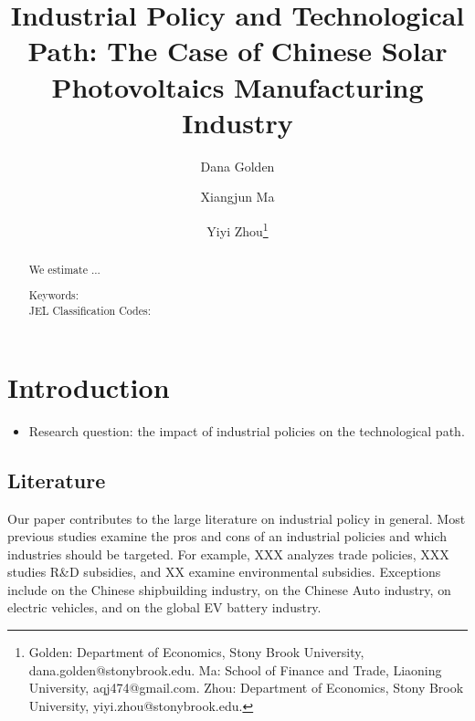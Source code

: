 \documentclass[12pt]{article}
\begin{document}
\title{Industrial Policy and Technological Path: The Case of Chinese Solar Photovoltaics Manufacturing Industry}

\author{Dana Golden \and Xiangjun Ma \and  Yiyi Zhou\thanks{Golden: Department of Economics, Stony Brook University, dana.golden@stonybrook.edu. Ma: School of Finance and Trade, Liaoning University, aqj474@gmail.com. Zhou: Department of Economics, Stony Brook University, yiyi.zhou@stonybrook.edu.}}

\maketitle

\begin{abstract}

\singlespacing 

We estimate ...



\thispagestyle{empty}

\begin{description}
\item[Keywords:] 

\item[JEL Classification Codes:] 
\end{description}
\end{abstract}


\clearpage
\setcounter{page}{1}

\section{Introduction}
\begin{itemize}
    \item Research question: the impact of industrial policies on the technological path.
\end{itemize}

\subsection*{Literature}
Our paper contributes to the large literature on industrial policy in general. Most previous studies examine the pros and cons of an industrial policies and which industries should be targeted. For example, XXX analyzes trade policies, XXX studies R\&D subsidies, and XX examine environmental subsidies. Exceptions include \citet{barwick2025industrial} on the Chinese shipbuilding industry, \citet{bai2020quid} on the Chinese Auto industry, \citet{barwick2024attribute} on electric vehicles, and \citet{barwick2025drive} on the global EV battery industry. 
\end{document}
